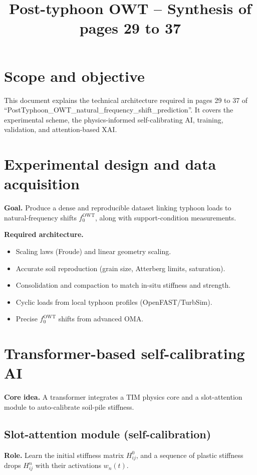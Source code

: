 \documentclass[11pt]{article}
\title{Post-typhoon OWT -- Synthesis of pages 29 to 37}
\author{}
\date{}
\begin{document}
\maketitle

\section{Scope and objective}
This document explains the technical architecture required in pages 29 to 37 of
``PostTyphoon\_OWT\_natural\_frequency\_shift\_prediction''. It covers the experimental
scheme, the physics-informed self-calibrating AI, training, validation, and
attention-based XAI.

\section{Experimental design and data acquisition}
\textbf{Goal.} Produce a dense and reproducible dataset linking typhoon loads to
natural-frequency shifts $f_0^{\mathrm{OWT}}$, along with support-condition measurements.

\textbf{Required architecture.}
\begin{itemize}
  \item Scaling laws (Froude) and linear geometry scaling.
  \item Accurate soil reproduction (grain size, Atterberg limits, saturation).
  \item Consolidation and compaction to match in-situ stiffness and strength.
  \item Cyclic loads from local typhoon profiles (OpenFAST/TurbSim).
  \item Precise $f_0^{\mathrm{OWT}}$ shifts from advanced OMA.
\end{itemize}

\section{Transformer-based self-calibrating AI}
\textbf{Core idea.} A transformer integrates a TIM physics core and a slot-attention
module to auto-calibrate soil-pile stiffness.

\subsection{Slot-attention module (self-calibration)}
\textbf{Role.} Learn the initial stiffness matrix $H_{ij}^0$, and a sequence of plastic
stiffness drops $H_{ij}^n$ with their activations $w_n(t)$.
\end{document}
